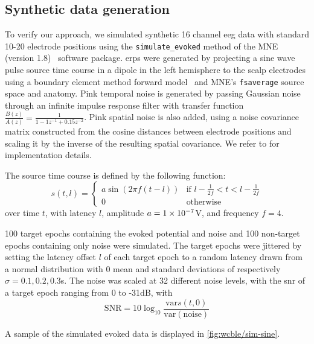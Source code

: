 \subsection{Synthetic data generation}
To verify our approach, we simulated synthetic 16 channel \ac{eeg} data with standard
10-20 electrode positions using the \texttt{simulate\_evoked} method of the
MNE (version 1.8)~\cite{Gramfort2013} software package.
\Acp{erp} were generated by projecting a sine wave pulse source time course in a dipole in the
left hemisphere to the scalp electrodes using a boundary element method forward
model~\cite{Mosher1999} and MNE's \texttt{fsaverage} source space and anatomy.
Pink temporal noise is generated by passing Gaussian noise through an infinite
impulse response filter with transfer function
$\frac{B(z)}{A(z)} = \frac{1}{1 -1z^{-1}+0.15z^{-2}}$.
Pink spatial noise is also added, using a noise covariance matrix constructed from the
cosine distances between electrode positions and scaling it by the inverse of
the resulting spatial covariance.
We refer to \textcite{Gramfort2014} for implementation details.

The source time course is defined by the following function:
\begin{equation}
  s(t,l) =
  \begin{cases}
    a\sin\left(2\pi f\left(t-l\right)\right) & \text{if  $l-\frac{1}{2f} < t < l-\frac{1}{2f}$} \\
    0 & \text{otherwise}
  \end{cases}
\end{equation}
over time $t$, with latency $l$, amplitude $a=\num{1e{-7}}$V, and frequency
$f=4$.

100 target epochs containing the evoked potential and noise and 100
non-target epochs containing only noise were simulated.
The target epochs were jittered by setting the latency offset $l$
of each target epoch to a random latency drawn from a normal distribution with 0 mean and standard
deviations of respectively $\sigma=0.1,0.2,0.3$s.
The noise was scaled at 32 different noise levels, with the \ac{snr} of a
target epoch ranging from 0 to -31dB, with
\begin{equation}
  \text{SNR} = 10\log_{10}\frac{\text{var}s(t,0)}{\text{var}\left(\text{noise}\right)}
\end{equation}

A sample of the simulated evoked data is displayed in \cref{fig:wcble/sim-sine}.

